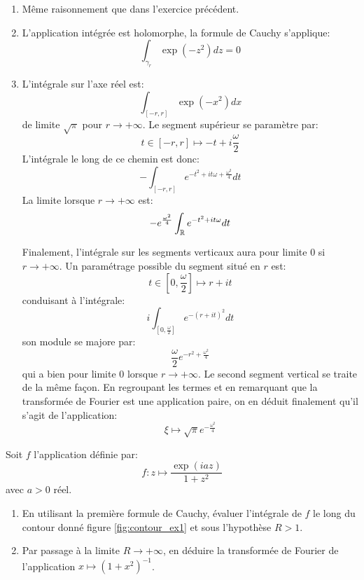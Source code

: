 \documentclass[a4paper, 12pt]{amsart}
\begin{document}
\begin{enumerate}
 \item Même raisonnement que dans l'exercice précédent.
\item L'application intégrée est holomorphe, la formule de Cauchy s'applique:
\[
  \int_{\gamma_r} \exp(-z^2)dz = 0
  \]
\item L'intégrale sur l'axe réel est:
\[
 \int_{[-r,r]} \exp(-x^2) dx 
\]
de limite $\sqrt{\pi}$ pour $r \to +\infty$. Le segment supérieur se paramètre
par:
\[
 t \in [-r,r] \mapsto -t+i \frac{\omega}{2}
\]
L'intégrale le long de ce chemin est donc:
\[
 - \int_{[-r,r]} e^{-t^2 + i t \omega + \frac{\omega^2}{4}} dt
\]
La limite lorsque $r\to +\infty$ est:
\[
- e^{\frac{\omega^2}{4}} \int_{\mathbb{R}}  e^{-t^2 + i t \omega} dt 
\]

Finalement, l'intégrale sur les segments verticaux aura pour limite $0$ si $r
\to +\infty$. Un paramétrage possible du segment situé en $r$ est:
\[
t \in [0, \frac{\omega}{2}] \mapsto r + it 
\]
conduisant à l'intégrale:
\[
 i \int_{[0, \frac{\omega}{2}]} e^{-(r+it)^2} dt 
\]
son module se majore par:
\[
 \frac{\omega}{2}e^{-r^2 + \frac{\omega^2}{4}}
\]
qui a bien pour limite $0$ lorsque $r \to +\infty$. Le second segment vertical
se traite de la même façon. En regroupant les termes et en remarquant que la
transformée de Fourier est une application paire, on en déduit finalement
qu'il s'agit de l'application:
\[
 \xi \mapsto \sqrt{\pi} e^{-\frac{\omega^2}{4}}
\]
\end{enumerate}
\begin{fex}
Soit $f$ l'application définie par:
\[
f \colon z \mapsto \frac{\exp(iaz)}{1+z^2}
\]
avec $a>0$ réel. 
\begin{enumerate}
  \item En utilisant la première formule de Cauchy, évaluer l'intégrale de $f$
  le long du contour donné figure \ref{fig:contour_ex1} et sous l'hypothèse
  $R>1$.
  \item Par passage à la limite $R \to +\infty$, en déduire la transformée de
  Fourier de l'application $x \mapsto (1+x^2)^{-1}$.
\end{enumerate}
\end{fex}
\end{document}
